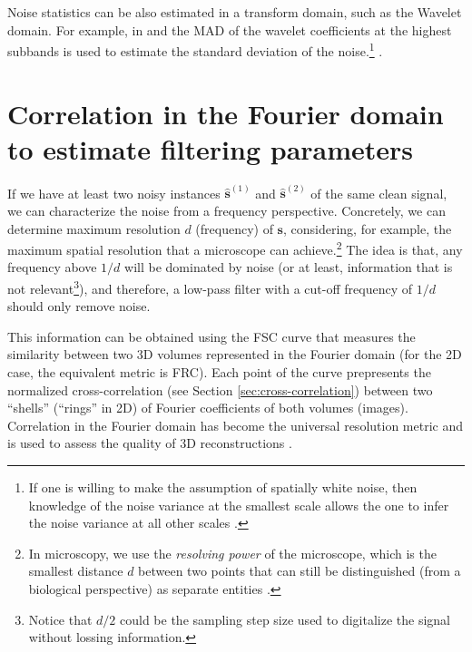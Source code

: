 Noise statistics can be also estimated in a transform domain, such as
the Wavelet domain. For example, in \cite{donoho1995adapting} and the
\gls{MAD} of the wavelet coefficients at the highest subbands is used
to estimate the standard deviation of the noise.\footnote{If one is
  willing to make the assumption of spatially white noise, then
  knowledge of the noise variance at the smallest scale allows the one
  to infer the noise variance at all other scales
  \cite{de2004training}.}  .

\section{Correlation in the Fourier domain to estimate filtering parameters}
\label{sec:fourier_correlation}

If we have at least two noisy instances $\hat{\mathbf{s}}^{(1)}$ and
$\hat{\mathbf{s}}^{(2)}$ of the same clean signal, we can characterize
the noise from a frequency perspective. Concretely, we can determine
maximum resolution $d$ (frequency) of $\mathbf{s}$, considering, for
example, the maximum spatial resolution that a microscope can
achieve.\footnote{In microscopy, we use the \emph{resolving power} of
  the microscope, which is the smallest distance $d$ between two
  points that can still be distinguished (from a biological
  perspective) as separate entities
  \cite{nieuwenhuizen2013measuring}.} The idea is that, any frequency
above $1/d$ will be dominated by noise (or at least, information that
is not relevant\footnote{Notice that $d/2$ could be the sampling step
  size used to digitalize the signal without lossing information.}),
and therefore, a low-pass filter with a cut-off frequency of $1/d$
should only remove noise.

This information can be obtained using the \gls{FSC}
curve that measures the similarity between two 3D volumes represented in
the Fourier domain \cite{verbeke2024self} (for the 2D case, the
equivalent metric is \gls{FRC}). Each point of the curve prepresents
the normalized cross-correlation (see Section
\ref{sec:cross-correlation}) between two ``shells'' (``rings'' in 2D)
of Fourier coefficients of both volumes (images). Correlation in the
Fourier domain has become the universal resolution metric and is used
to assess the quality of 3D reconstructions
\cite{rosenthal2003optimal,scheres2012prevention}.

